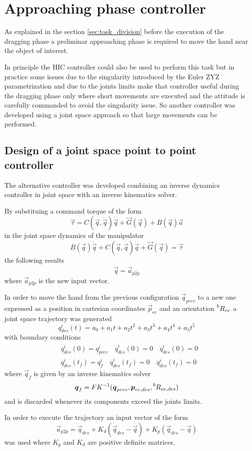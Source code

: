 \section{Approaching phase controller}
As explained in the section \ref{sec:task_division} before the execution of the dragging phase
a preliminar approaching phase is required  to move the hand near the object of interest.
\par
In principle the HIC controller could also be used to perform this task but in practice
some issues due to the singularity introduced by the Euler ZYZ parametrization and due to the
joints limits make that controller useful during the dragging phase only where short movements are executed
and the attitude is carefully commanded to avoid the singularity issue.
So another controller was developed using a joint space approach so that large movements can be performed.

\subsection{Design of a joint space point to point controller}
The alternative controller was developed combining an inverse dynamics controller in joint
space with an inverse kinematics solver.
\par
By substituing a command torque of the form
\[
\vec{\tau} = C(\vec{q}, \dot{\vec{q}}) \dot{\vec{q}} + \vec{G}(\vec{q}) + B(\vec{q}) \vec{a}
\]
in the joint space dynamics of the manipulator
\[
  B(\vec{q})\ddot{\vec{q}} + C(\vec{q}, \dot{\vec{q}}) \dot{\vec{q}} + \vec{G}(\vec{q}) = \vec{\tau}
\]
the following results
\[
\ddot{\vec{q}} = \vec{a}_{p2p}
\]
where $\vec{a}_{p2p}$ is the new input vector.
\par
In order to move the hand from the previous configuration $\vec{q}_{prev}$
to a new one expressed as a position in cartesian coordinates $\vec{p}_{ee}$ and
an orientation $\prescript{b}{}{R}_{ee}$ a joint space trajectory was generated
\[
q_{des}^{i}(t) = a_0 + a_1 t + a_2 t^2 + a_3 t^3 + a_4 t^4 + a_5 t^5
\]
with boundary conditions
\[
\begin{split}
  &q_{des}^{i}(0) = q_{prev}^{i} \quad \dot{q}_{des}^{i}(0) = 0 \quad \ddot{q}_{des}^{i}(0) = 0\\
  &q_{des}^{i}(t_f) = q_{f}^{i} \quad \dot{q}_{des}^{i}(t_f) = 0 \quad \ddot{q}_{des}^{i}(t_f) = 0
\end{split}
\]
where $\vec{q}_{f}$ is given by an inverse kinematics solver
\[
\vec{q}_{f} = FK^{-1}(\vec{q}_{prev}, \vec{p}_{ee,des},\prescript{b}{}{R}_{ee,des})
\]
and is discarded whenever its components exceed the joints limits.
\par
In order to execute the trajectory an input vector of the form
\[
\vec{a}_{p2p} = \ddot{\vec{q}}_{des} + K_d(\dot{\vec{q}}_{des} - \dot{\vec{q}}) + K_p(\vec{q}_{des} - \vec{q})
\]
was used where $K_p$ and $K_d$ are positive definite matrices.
\newpage
